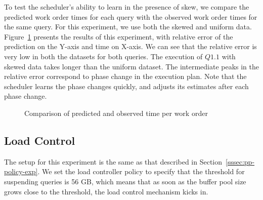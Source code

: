 To test the scheduler's ability to learn in the presence of skew, we compare the predicted work order times for each query with the observed work order times for the same query.
For this experiment, we use both the skewed and uniform data.
Figure~\ref{fig:pred-vs-observed-time-per-wo} presents the results of this experiment, with relative error of the prediction on the Y-axis and time on X-axis.
We can see that the relative error is very low in both the datasets for both queries. 
The execution of $Q1.1$ with skewed data takes longer than the uniform dataset.
The intermediate peaks in the relative error correspond to phase change in the execution plan. 
Note that the scheduler learns the phase changes quickly, and adjusts its estimates after each phase change. 

\begin{figure}[b]
	\centering
	\caption{Comparison of predicted and observed time per work order}
	\label{fig:pred-vs-observed-time-per-wo}
	\vspace{-1em}
\end{figure}

\subsection{Load Control}
The setup for this experiment is the same as that described in Section~\ref{sssec:pp-policy-exp}.
We set the load controller policy to specify that the threshold for suspending queries is 56 GB, which means that as soon as the buffer pool size grows close to the threshold, the load control mechanism kicks in.

